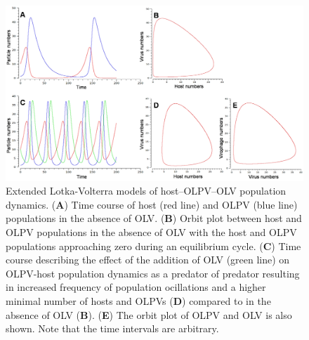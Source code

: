 \begin{figure}
\includegraphics[width=\textwidth]{olv_figures/LV.jpg}
\caption[Extended Lotka-Volterra models of host--OLPV--OLV population dynamics]{Extended Lotka-Volterra models of host--OLPV--OLV population dynamics. 
(\textbf{A}) Time course of host (red line) and \ac{OLPV} (blue line) populations in the absence of \ac{OLV}. 
(\textbf{B}) Orbit plot between host and \ac{OLPV} populations in the absence of \ac{OLV} with the host and \ac{OLPV} populations approaching zero during an equilibrium cycle. 
(\textbf{C}) Time course describing the effect of the addition of \ac{OLV} (green line) on OLPV-host population dynamics as a predator of predator resulting in increased frequency of population ocillations and a higher minimal number of hosts and \acp{OLPV} (\textbf{D}) compared to in the absence of OLV (\textbf{B}). 
(\textbf{E}) The orbit plot of \ac{OLPV} and \ac{OLV} is also shown. 
Note that the time intervals are arbitrary.
}
\label{fig:LV}

\end{figure}

